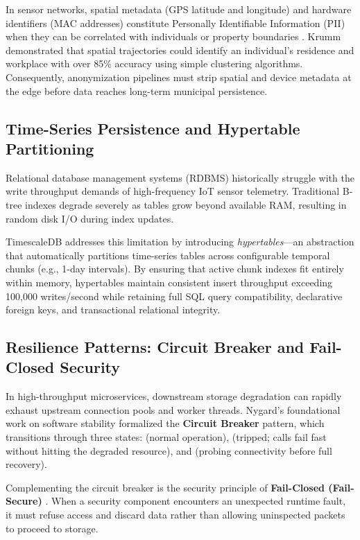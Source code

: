 \documentclass[a4paper]{article}
\begin{document}
In sensor networks, spatial metadata (GPS latitude and longitude) and hardware identifiers (MAC addresses) constitute Personally Identifiable Information (PII) when they can be correlated with individuals or property boundaries \cite{krumm2009survey}. Krumm demonstrated that spatial trajectories could identify an individual's residence and workplace with over 85\% accuracy using simple clustering algorithms. Consequently, anonymization pipelines must strip spatial and device metadata at the edge before data reaches long-term municipal persistence.

\subsection{Time-Series Persistence and Hypertable Partitioning}
Relational database management systems (RDBMS) historically struggle with the write throughput demands of high-frequency IoT sensor telemetry. Traditional B-tree indexes degrade severely as tables grow beyond available RAM, resulting in random disk I/O during index updates.

TimescaleDB \cite{timescaledb_paper} addresses this limitation by introducing \emph{hypertables}---an abstraction that automatically partitions time-series tables across configurable temporal chunks (e.g., 1-day intervals). By ensuring that active chunk indexes fit entirely within memory, hypertables maintain consistent insert throughput exceeding 100,000 writes/second while retaining full SQL query compatibility, declarative foreign keys, and transactional relational integrity.

\subsection{Resilience Patterns: Circuit Breaker and Fail-Closed Security}
In high-throughput microservices, downstream storage degradation can rapidly exhaust upstream connection pools and worker threads. Nygard's foundational work on software stability \cite{nygard2018release} formalized the \textbf{Circuit Breaker} pattern, which transitions through three states:  (normal operation),  (tripped; calls fail fast without hitting the degraded resource), and  (probing connectivity before full recovery).

Complementing the circuit breaker is the security principle of \textbf{Fail-Closed (Fail-Secure)} \cite{saltzer1975protection}. When a security component encounters an unexpected runtime fault, it must refuse access and discard data rather than allowing uninspected packets to proceed to storage.
\end{document}
